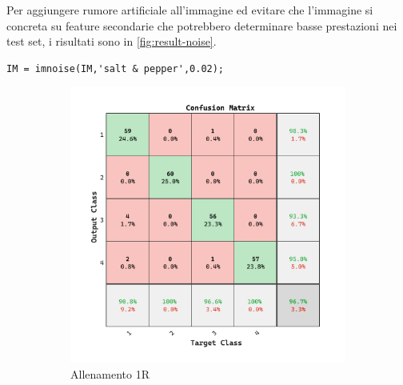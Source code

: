 Per aggiungere rumore artificiale all'immagine ed evitare che l'immagine si concreta su feature secondarie che potrebbero determinare basse prestazioni nei test set, i risultati sono in \cref{fig:result-noise}.

\begin{lstlisting}
IM = imnoise(IM,'salt & pepper',0.02);
\end{lstlisting}

\begin{figure}[H]
    \centering
    \begin{subfigure}{0.49\textwidth}
        \includegraphics[width=\textwidth]{addestramento-rete-neurale/one-noise.pdf}
        \caption{Allenamento 1R} 
    \end{subfigure}
    \begin{subfigure}{0.49\textwidth}

\end{subfigure}
\end{figure}
